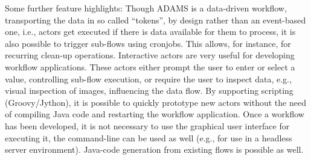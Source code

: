 \documentclass[a4paper,10pt]{article}
\begin{document}
Some further feature highlights: Though ADAMS is a data-driven workflow, transporting the data in so called ``tokens'', by design rather than an event-based one, i.e., actors get executed if there is data available for them to process, it is also possible to trigger sub-flows using cronjobs. This allows, for instance, for recurring clean-up operations. Interactive actors are very useful for developing workflow applications. These actors either prompt the user to enter or select a value, controlling sub-flow execution, or require the user to inspect data, e.g., visual inspection of images, influencing the data flow. By supporting scripting (Groovy/Jython), it is possible to quickly prototype new actors without the need of compiling Java code and restarting the workflow application. Once a workflow has been developed, it is not necessary to use the graphical user interface for executing it, the command-line can be used as well (e.g., for use in a headless server environment). Java-code generation from existing flows is possible as well.
\end{document}
